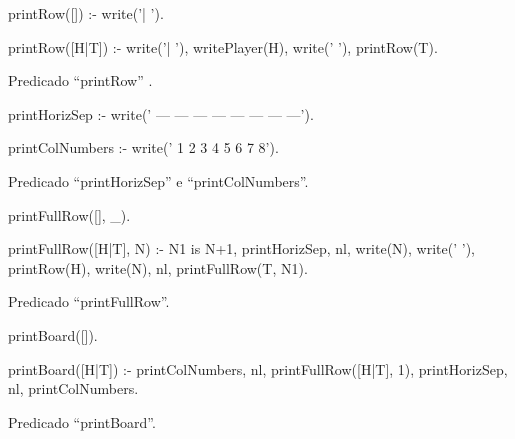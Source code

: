 \documentclass[15pt,a4paper]{article}
\begin{document}
\begin{code}[H]
	\begin{verbatimtab}

printRow([])    :- 
	write('| ').

printRow([H|T]) :-
	write('| '),
	writePlayer(H),
	write(' '),
	printRow(T).
\end{verbatimtab}
\caption{Predicado ``printRow'' .}
\end{code}



\begin{code}[H]
	\begin{verbatimtab}

printHorizSep   :-
	write('   --- --- --- --- --- --- --- ---').

printColNumbers :-
	write('    1   2   3   4   5   6   7   8').
\end{verbatimtab}
\caption{Predicado ``printHorizSep'' e ``printColNumbers''.}
\end{code}



\begin{code}[H]
	\begin{verbatimtab}

printFullRow([], _).

printFullRow([H|T], N) :-
	N1 is N+1,
	printHorizSep,
	nl,
	write(N),
	write(' '),
	printRow(H),
	write(N),
	nl,
	printFullRow(T, N1).
\end{verbatimtab}
\caption{Predicado ``printFullRow''.}
\end{code}



\begin{code}[H]
	\begin{verbatimtab}

printBoard([]).

printBoard([H|T]) :-
	printColNumbers,
	nl,
	printFullRow([H|T], 1),
	printHorizSep,
	nl,
	printColNumbers.
\end{verbatimtab}
\caption{Predicado ``printBoard''.}
\end{code}
\end{document}
